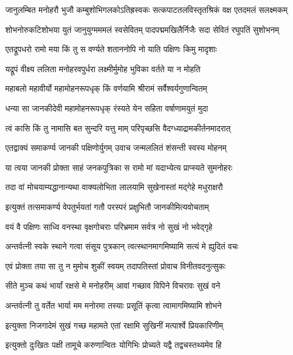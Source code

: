 \fourlineindentedshloka
{जानुलम्बित मनोहरौ भुजौ}
{कम्बुशोभिगलकोऽतिह्रस्वकः}
{सत्कपाटतलविस्तृतश्रिकं}
{वक्ष एतदमलं सलक्ष्मकम्}%

\fourlineindentedshloka
{शोभनोरुकटिशोभया युतं}
{जानुयुग्मममलं स्वसेवितम्}
{पादपद्ममखिलैर्निजैः सदा}
{सेवितं रघुपतिं सुशोभनम्}%

\twolineshloka
{एतद्रूपधरो रामो मया किं तु स वर्ण्यते}
{शताननोपि नो याति पक्षिणः किमु मादृशाः}%

\twolineshloka
{यद्रूपं वीक्ष्य ललिता मनोहरवपुर्धरा}
{लक्ष्मीर्मुमोह भुविका वर्तते या न मोहति}%

\twolineshloka
{महाबलो महावीर्यो महामोहनरूपधृक्}
{किं वर्णयामि श्रीरामं सर्वैश्वर्यगुणान्वितम्}%

\twolineshloka
{धन्या सा जानकीदेवी महामोहनरूपधृक्}
{रंस्यते येन सहिता वर्षाणामयुतं मुदा}%

\twolineshloka
{त्वं कासि किं तु नामासि बत सुन्दरि यत्तु माम्}
{परिपृच्छसि वैदग्ध्याद्रामकीर्तनमादरात्}%

\twolineshloka
{एतद्वाक्यं समाकर्ण्य जानकी पक्षिणोर्युगम्}
{उवाच जन्मललितं शंसन्ती स्वस्य मोहनम्}%

\twolineshloka
{या त्वया जानकी प्रोक्ता साहं जनकपुत्रिका}
{स रामो मां यदाभ्येत्य प्राप्स्यते सुमनोहरः}%

\twolineshloka
{तदा वां मोचयाम्यद्धानान्यथा वाक्यलोभिता}
{लालयामि सुखेनास्तां मद्गेहे मधुराक्षरौ}%

\twolineshloka
{इत्युक्तं तत्समाकर्ण्य वेपतुर्भयतां गतौ}
{परस्परं प्रक्षुभितौ जानकीमित्यवोचताम्}%

\twolineshloka
{वयं वै पक्षिणः साध्वि वनस्था वृक्षगोचराः}
{परिभ्रमाम सर्वत्र नो सुखं नो भवेद्गृहे}%

\twolineshloka
{अन्तर्वत्नी स्वके स्थाने गत्वा संसूय पुत्रकान्}
{त्वत्स्थानमागमिष्यामि सत्यं मे ह्युदितं वचः}%

\twolineshloka
{एवं प्रोक्ता तया सा तु न मुमोच शुकीं स्वयम्}
{तदापतिस्तां प्रोवाच विनीतवदनुत्सुकः}%

\twolineshloka
{सीते मुञ्च कथं भार्यां रक्षसे मे मनोहरीम्}
{आवां गच्छाव विपिने विचरावः सुखं वने}%

\twolineshloka
{अन्तर्वत्नी तु वर्तेत भार्या मम मनोरमा}
{तस्याः प्रसूतिं कृत्वा त्वामागमिष्यामि शोभने}%

\twolineshloka
{इत्युक्ता निजगादेमं सुखं गच्छ महामते}
{एतां रक्षामि सुखिनीं मत्पार्श्वे प्रियकारिणीम्}%

\twolineshloka
{इत्युक्तो दुःखितः पक्षी तामूचे करुणान्वितः}
{योगिभिः प्रोच्यते यद्वै तद्वचस्तथ्यमेव हि}%

